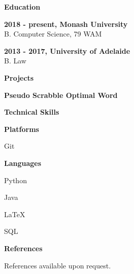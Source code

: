 \documentclass[a4paper, 11pt, draft]{memoir}
\newcommand{\SmallSep}{\vspace{0.5em}}
\newcommand{\CVSection}[1]
	{\Large\textbf{#1}\par
	\SmallSep\normalsize\normalfont}
\newcommand{\CVItem}[1]
	{\textbf{\color{RoyalBlue} #1}}
\begin{document}
    \CVSection{Education}
    \CVItem{2018 - present, Monash University}\\
    B. Computer Science, 79 WAM
    \SmallSep
    
    \CVItem{2013 - 2017, University of Adelaide}\\
    B. Law
    \Smallsep

    \CVSection{Projects}
    \CVItem{Pseudo Scrabble Optimal Word}\\
    \Smallsep 
    
    \CVSection{Technical Skills}
    \CVItem{Platforms}
    \begin{multicols}{2}
    \begin{compactitem}[\color{RoyalBlue}$\circ$]
        \item Git
    \end{compactitem}
    \end{multicols}
    \SmallSep
    
    \CVItem{Languages}
    \begin{multicols}{2}
    \begin{compactitem}[\color{RoyalBlue}$\circ$]
        \item Python
        \item Java
        \item LaTeX
        \item SQL
    \end{compactitem}
    \end{multicols}
    \Smallsep
    \CVSection{References}
    References available upon request.
    
\end{document}
